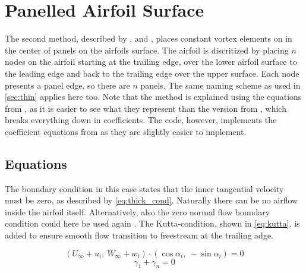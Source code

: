 
\section{Panelled Airfoil Surface}
\label{sec:thick}
The second method, described by \citeauthor{katz_plotkin}\cite{katz_plotkin},
and \citeauthor{kuethe_chow_1998}\cite{kuethe_chow_1998}, places constant vortex
elements on in the center of panels on the airfoils surface. The airfoil is
discritized by placing $n$ nodes on the airfoil starting at the trailing edge,
over the lower airfoil surface to the leading edge and back to the trailing edge
over the upper surface. Each node presents a panel edge, so there are $n$
panels. The same naming scheme as used in \autoref{sec:thin} applies here too.
Note that the method is explained using the equations from
\citeauthor{katz_plotkin}\cite{katz_plotkin}, as it is easier to see what they
represent than the version from
\citeauthor{kuethe_chow_1998}\cite{kuethe_chow_1998}, which breaks everything
down in coefficients. The code, however, implements the coefficient equations
from \citeauthor{kuethe_chow_1998}\cite{kuethe_chow_1998} as they are slightly
easier to implement.


\subsection{Equations}
\label{ssec:eq_thick}
The boundary condition in this case states that the inner tangential velocity
must be zero, as described by \autoref{eq:thick_cond}\cite{katz_plotkin}.
Naturally there can be no airflow inside the airfoil itself. Alternatively, also
the zero normal flow boundary condition could here be used again
\cite{kuethe_chow_1998}. The Kutta-condition, shown in \autoref{eq:kutta}, is
added to ensure smooth flow transition to freestream at the trailing adge.

\begin{equation}
\label{eq:thick_cond}
    \left( U_\infty + u_i, \: W_\infty + w_i \right) \cdot \left( \cos \alpha_i,
    \: -\sin \alpha_i \right) = 0
\end{equation}
\begin{equation}
  \label{eq:kutta}
      \gamma_1 + \gamma_{n} = 0
\end{equation}

